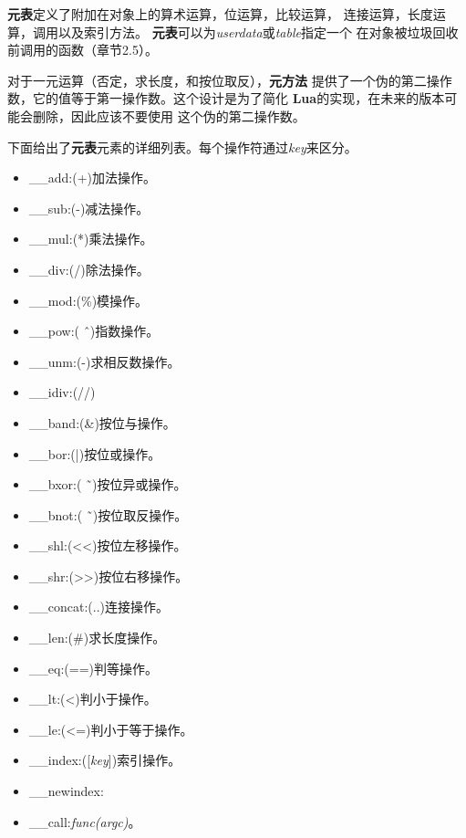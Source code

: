 \documentclass{ctexart}
\begin{document}
\textbf{元表}定义了附加在对象上的算术运算，位运算，比较运算，
连接运算，长度运算，调用以及索引方法。
\textbf{元表}可以为\emph{userdata}或\emph{table}指定一个
在对象被垃圾回收前调用的函数（章节2.5）。

对于一元运算（否定，求长度，和按位取反），\textbf{元方法}
提供了一个伪的第二操作数，它的值等于第一操作数。这个设计是为了简化
\textbf{Lua}的实现，在未来的版本可能会删除，因此应该不要使用
这个伪的第二操作数。

下面给出了\textbf{元表}元素的详细列表。每个操作符通过\emph{key}来区分。

\begin{itemize}
\item \_\_add:(+)加法操作。

\item \_\_sub:(-)减法操作。

\item \_\_mul:(*)乘法操作。

\item \_\_div:(/)除法操作。

\item \_\_mod:(\%)模操作。

\item \_\_pow:( \^ \  )指数操作。

\item \_\_unm:(-)求相反数操作。

\item \_\_idiv:(//)

\item \_\_band:(\&)按位与操作。

\item \_\_bor:(|)按位或操作。

\item \_\_bxor:( \~\ )按位异或操作。

\item \_\_bnot:( \~\ )按位取反操作。

\item \_\_shl:(<<)按位左移操作。

\item \_\_shr:(>>)按位右移操作。

\item \_\_concat:(..)连接操作。

\item \_\_len:(\#)求长度操作。

\item \_\_eq:(==)判等操作。

\item \_\_lt:(<)判小于操作。

\item \_\_le:(<=)判小于等于操作。

\item \_\_index:([\emph{key}])索引操作。

\item \_\_newindex:

\item \_\_call:\emph{func(argc)}。

\end{itemize}
\end{document}
